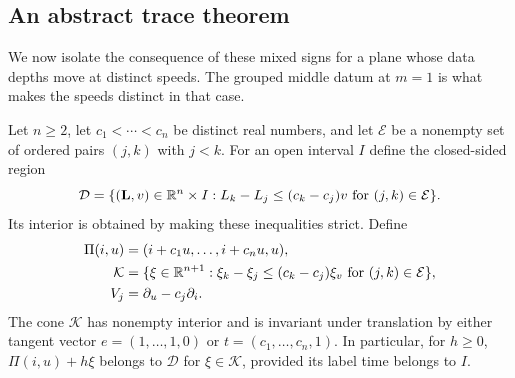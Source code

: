 \subsection{An abstract trace theorem}

We now isolate the consequence of these mixed signs for a plane whose
data depths move at distinct speeds.  The grouped middle datum at $m=1$
is what makes the speeds distinct in that case.

Let $n\ge2$, let $c_1<\cdots<c_n$ be distinct real numbers, and let
$\mathcal E$ be a nonempty set of ordered pairs $(j,k)$ with $j<k$.
For an open interval $I$ define the closed-sided region
\[
 \mathcal D=\{(\mathbf L,v)\in\mathbb R^n\times I:
       L_k-L_j\le(c_k-c_j)v\text{ for }(j,k)\in\mathcal E\}.
\]
Its interior is obtained by making these inequalities strict.  Define
\begin{equation}\label{eq:trace-plane-cone}
 \begin{split}
 \Pi(i,u)&=(i+c_1u,\ldots,i+c_nu,u),\\
 \mathcal K&=\{\xi\in\mathbb R^{n+1}:
       \xi_k-\xi_j\le(c_k-c_j)\xi_v
                      \text{ for }(j,k)\in\mathcal E\},\\
 V_j&=\partial_u-c_j\partial_i.
 \end{split}
\end{equation}
The cone $\mathcal K$ has nonempty interior and is invariant under
translation by either tangent vector
$e=(1,\ldots,1,0)$ or $t=(c_1,\ldots,c_n,1)$.
In particular, for $h\ge0$, $\Pi(i,u)+h\xi$ belongs to $\mathcal D$ for
$\xi\in\mathcal K$, provided its label time belongs to $I$.

